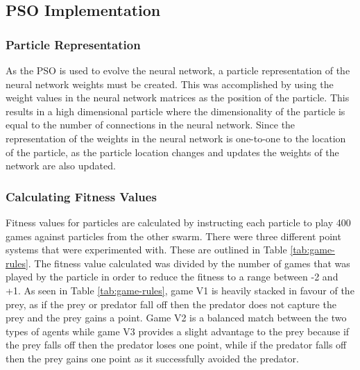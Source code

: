 \subsection{PSO Implementation}

\subsubsection{Particle Representation}
As the PSO is used to evolve the neural network, a particle representation of the neural network weights must be created. This was accomplished by using the weight values in the neural network matrices as the position of the particle. This results in a high dimensional particle where the dimensionality of the particle is equal to the number of connections in the neural network. Since the representation of the weights in the neural network is one-to-one to the location of the particle, as the particle location changes and updates the weights of the network are also updated.


\subsubsection{Calculating Fitness Values} \label{sec:calc-fitness}
Fitness values for particles are calculated by instructing each particle to play 400 games against particles from the other swarm. There were three different point systems that were experimented with. These are outlined in Table \ref{tab:game-rules}. The fitness value calculated was divided by the number of games that was played by the particle in order to reduce the fitness to a range between -2 and +1. As seen in Table \ref{tab:game-rules}, game V1 is heavily stacked in favour of the prey, as if the prey or predator fall off then the predator does not capture the prey and the prey gains a point. Game V2 is a balanced match between the two types of agents while game V3 provides a slight advantage to the prey because if the prey falls off then the predator loses one point, while if the predator falls off then the prey gains one point as it successfully avoided the predator.

